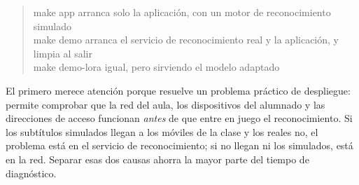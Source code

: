 \begin{quote}\ttfamily
make app \qquad\rmfamily arranca solo la aplicación, con un motor de reconocimiento
simulado\\
\ttfamily make demo \qquad\rmfamily arranca el servicio de reconocimiento real y la
aplicación, y limpia al salir\\
\ttfamily make demo-lora \quad\rmfamily igual, pero sirviendo el modelo adaptado
\end{quote}

El primero merece atención porque resuelve un problema práctico de despliegue: permite
comprobar que la red del aula, los dispositivos del alumnado y las direcciones de acceso
funcionan \emph{antes} de que entre en juego el reconocimiento. Si los subtítulos simulados
llegan a los móviles de la clase y los reales no, el problema está en el servicio de
reconocimiento; si no llegan ni los simulados, está en la red. Separar esas dos causas
ahorra la mayor parte del tiempo de diagnóstico.
